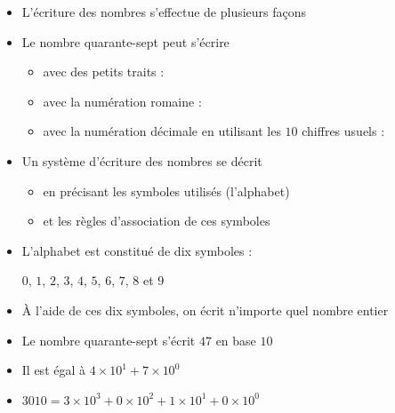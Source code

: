 \begin{frame}


\begin{itemize}
  \item<2-> L'écriture des nombres s'effectue de plusieurs façons
  
  \item<3-> Le nombre quarante-sept peut s'écrire
  
\begin{itemize}
\item<4-> avec des petits traits :
{\bf\color{red}
\textbar{}\textbar{}\textbar{}\textbar{}\textbar{} \textbar{}\textbar{}\textbar{}\textbar{}\textbar{} \textbar{}\textbar{}\textbar{}\textbar{}\textbar{} \textbar{}\textbar{}\textbar{}\textbar{}\textbar{} \textbar{}\textbar{}\textbar{}\textbar{}\textbar{} \textbar{}\textbar{}\textbar{}\textbar{}\textbar{} \textbar{}\textbar{}\textbar{}\textbar{}\textbar{} \textbar{}\textbar{}\textbar{}\textbar{}\textbar{} \textbar{}\textbar{}\textbar{}\textbar{}\textbar{} \textbar{}\textbar{}
}
\item<5-> avec la numération romaine : {\bf\color{red}} 
\item<6-> avec la numération décimale en utilisant les $10$ chiffres usuels : {\bf\color{red}}
\end{itemize}

  \item<7-> Un système d'écriture des nombres se décrit
  \begin{itemize}
    \item<8-> en précisant les symboles utilisés (l'alphabet)
    \item<9-> et les règles d'association de ces symboles
  \end{itemize}
\end{itemize}
\end{frame}


\begin{frame}



\begin{itemize}
  \item<2-> L'alphabet est constitué de dix symboles :  
  
  \centerline{$0$, $1$, $2$, $3$, $4$, $5$, $6$, $7$, $8$ et $9$}
  
  \item<3-> À l'aide de ces dix symboles, on écrit n'importe quel nombre entier
  
  \item<4-> Le nombre quarante-sept s'écrit $47$ en base $10$
  
  \item<5-> Il est égal à $4\times 10^1 + 7\times 10^0$
  
  \item<6-> $3010 = 3\times 10^3 + 0\times 10^2 + 1\times 10^1 + 0\times 10^0$  
\end{itemize}

\end{frame}


